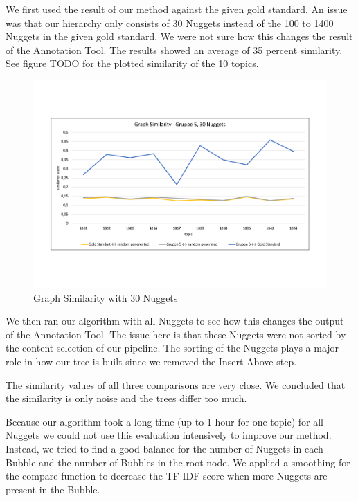 We first used the result of our method against the given gold standard. An issue was that our hierarchy only consists of 30 Nuggets instead of the 100 to 1400 Nuggets in the given gold standard. We were not sure how this changes the result of the Annotation Tool. The results showed an average of 35 percent similarity. See figure TODO for the plotted similarity of the 10 topics.

\begin{figure}[H]
	\centering
	\includegraphics[trim= 0 120 0 120,width=\textwidth]{img/sim_v1.pdf}
	\caption{Graph Similarity with 30 Nuggets}
	\label{fig:spc}
\end{figure}

We then ran our algorithm with all Nuggets to see how this changes the output of the Annotation Tool. The issue here is that these Nuggets were not sorted by the content selection of our pipeline. The sorting of the Nuggets plays a major role in how our tree is built since we removed the Insert Above step.

The similarity values of all three comparisons are very close. We concluded that the similarity is only noise and the trees differ too much.

Because our algorithm took a long time (up to 1 hour for one topic) for all Nuggets we could not use this evaluation intensively to improve our method. Instead, we tried to find a good balance for the number of Nuggets in each Bubble and the number of Bubbles in the root node. We applied a smoothing for the compare function to decrease the TF-IDF score when more Nuggets are present in the Bubble.


